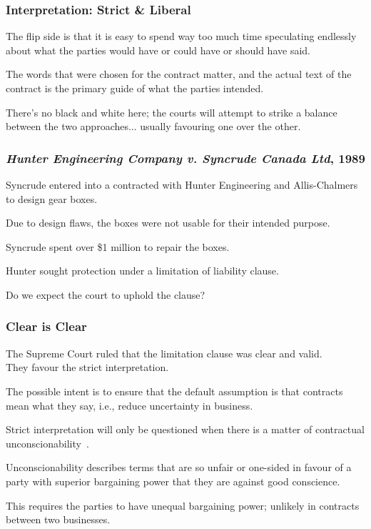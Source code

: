 \begin{frame}
\frametitle{Interpretation: Strict \& Liberal}

The flip side is that it is easy to spend way too much time speculating endlessly about what the parties would have or could have or should have said.

The words that were chosen for the contract matter, and the actual text of the contract is the primary guide of what the parties intended.

There's no black and white here; the courts will attempt to strike a balance between the two approaches... usually favouring one over the other.

\end{frame}



\begin{frame}
\frametitle{\textit{Hunter Engineering Company v. Syncrude Canada Ltd}, 1989}


Syncrude entered into a contracted with Hunter Engineering and Allis-Chalmers to design gear boxes.  

Due to design flaws, the boxes were not usable for their intended purpose.  

Syncrude spent over \$1 million to repair the boxes. 

Hunter sought protection under a limitation of liability clause.

Do we expect the court to uphold the clause?

\end{frame}



\begin{frame}
\frametitle{Clear is Clear}

The Supreme Court  ruled that the limitation clause was clear and valid.\\
\quad They favour the strict interpretation.

The possible intent is to ensure that the default assumption is that contracts mean what they say, i.e., reduce uncertainty in business.

Strict interpretation will only be questioned when there is a matter of contractual \alert{unconscionability}~\cite{lpe}.

Unconscionability describes terms that are so unfair or one-sided in favour of a party with superior bargaining power that they are against good conscience.

This requires the parties to have unequal bargaining power; unlikely in contracts between two businesses.
\end{frame}



